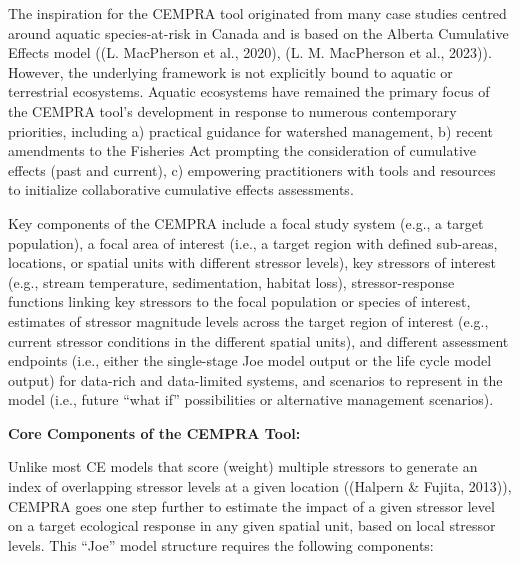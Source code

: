 \documentclass[
  letterpaper,
  DIV=11,
  numbers=noendperiod]{scrreprt}
\begin{document}
The inspiration for the CEMPRA tool originated from many case studies
centred around aquatic species-at-risk in Canada and is based on the
Alberta Cumulative Effects model ((L. MacPherson et al., 2020), (L. M.
MacPherson et al., 2023)). However, the underlying framework is not
explicitly bound to aquatic or terrestrial ecosystems. Aquatic
ecosystems have remained the primary focus of the CEMPRA tool's
development in response to numerous contemporary priorities, including
a) practical guidance for watershed management, b) recent amendments to
the Fisheries Act prompting the consideration of cumulative effects
(past and current), c) empowering practitioners with tools and resources
to initialize collaborative cumulative effects assessments.

Key components of the CEMPRA include a focal study system (e.g., a
target population), a focal area of interest (i.e., a target region with
defined sub-areas, locations, or spatial units with different stressor
levels), key stressors of interest (e.g., stream temperature,
sedimentation, habitat loss), stressor-response functions linking key
stressors to the focal population or species of interest, estimates of
stressor magnitude levels across the target region of interest (e.g.,
current stressor conditions in the different spatial units), and
different assessment endpoints (i.e., either the single-stage Joe model
output or the life cycle model output) for data-rich and data-limited
systems, and scenarios to represent in the model (i.e., future ``what
if'' possibilities or alternative management scenarios).

\textbf{Core Components of the CEMPRA Tool:}

Unlike most CE models that score (weight) multiple stressors to generate
an index of overlapping stressor levels at a given location ((Halpern \&
Fujita, 2013)), CEMPRA goes one step further to estimate the impact of a
given stressor level on a target ecological response in any given
spatial unit, based on local stressor levels. This ``Joe'' model
structure requires the following components:
\end{document}
